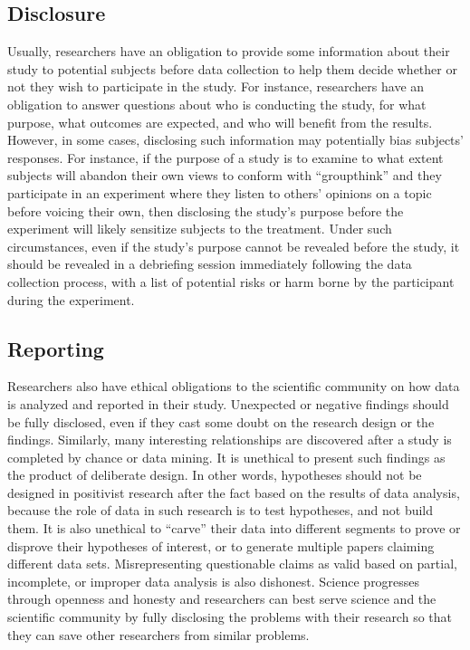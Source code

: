 \subsection{Disclosure}

Usually, researchers have an obligation to provide some information about their study to potential subjects before data collection to help them decide whether or not they wish to participate in the study. For instance, researchers have an obligation to answer questions about who is conducting the study, for what purpose, what outcomes are expected, and who will benefit from the results. However, in some cases, disclosing such information may potentially bias subjects' responses. For instance, if the purpose of a study is to examine to what extent subjects will abandon their own views to conform with ``groupthink'' and they participate in an experiment where they listen to others' opinions on a topic before voicing their own, then disclosing the study's purpose before the experiment will likely sensitize subjects to the treatment. Under such circumstances, even if the study's purpose cannot be revealed before the study, it should be revealed in a debriefing session immediately following the data collection process, with a list of potential risks or harm borne by the participant during the experiment.


\subsection{Reporting}

Researchers also have ethical obligations to the scientific community on how data is analyzed and reported in their study. Unexpected or negative findings should be fully disclosed, even if they cast some doubt on the research design or the findings. Similarly, many interesting relationships are discovered after a study is completed by chance or data mining. It is unethical to present such findings as the product of deliberate design. In other words, hypotheses should not be designed in positivist research after the fact based on the results of data analysis, because the role of data in such research is to test hypotheses, and not build them. It is also unethical to ``carve'' their data into different segments to prove or disprove their hypotheses of interest, or to generate multiple papers claiming different data sets. Misrepresenting questionable claims as valid based on partial, incomplete, or improper data analysis is also dishonest. Science progresses through openness and honesty and researchers can best serve science and the scientific community by fully disclosing the problems with their research so that they can save other researchers from similar problems.

